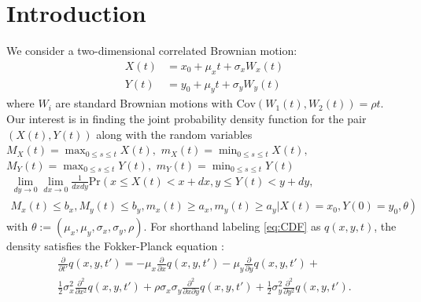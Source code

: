 \label{ch:galerkin}

\section{Introduction}

We consider a two-dimensional correlated Brownian motion:
\begin{align}
  X(t) &= x_0 + \mu_x t + \sigma_x W_x(t)  \label{eq:X} \\
  Y(t) &= y_0 + \mu_y t + \sigma_y W_y(t)  \label{eq:Y} 
\end{align}
where $W_i$ are standard Brownian motions with
$\mbox{Cov}(W_1(t), W_2(t)) = \rho t$. Our interest is in finding the
joint probability density function for the pair $(X(t), Y(t))$
along with the random variables $M_X(t)=\max_{0\leq s\leq t}X(t),$
$m_X(t)=\min_{0\leq s\leq t}X(t),$ $M_Y(t)=\max_{0\leq s\leq t}Y(t),$
$m_Y(t)=\min_{0\leq s\leq t}Y(t)$
\begin{multline}
  \lim_{dy \to 0} \lim_{dx \to 0} \frac{1}{dx dy} \mbox{Pr}\left(x \leq X(t) < x+dx, y \leq Y(t) < y+dy, \right. \\
  \left. M_x(t) \leq b_x, M_y(t) \leq b_y, m_x(t) \geq a_x, m_y(t) \geq a_y | X(t) = x_0, Y(0) = y_0,
  \theta \right) \label{eq:CDF}
\end{multline}
with $\theta := (\mu_x, \mu_y, \sigma_x, \sigma_y, \rho).$ %
For shorthand labeling \eqref{eq:CDF} as $q(x,y,t)$, the density
satisfies the Fokker-Planck equation \cite{oksendal2013stochastic}:
\begin{multline}
  \displaystyle \frac{\partial}{\partial t'} q(x,y,t') = -\mu_x \frac{\partial}{\partial x}q(x,y,t')
  - \mu_y \frac{\partial}{\partial y}q(x,y,t') + \\
  \frac{1}{2}\sigma_x^2 \frac{\partial^2}{\partial x^2}q(x,y,t') + \rho\sigma_x\sigma_y \frac{\partial^2}{\partial x \partial y}q(x,y,t')
  + \frac{1}{2}\sigma_y^2 \frac{\partial^2}{\partial y^2}q(x,y,t'). \label{eq:1}
\end{multline}
